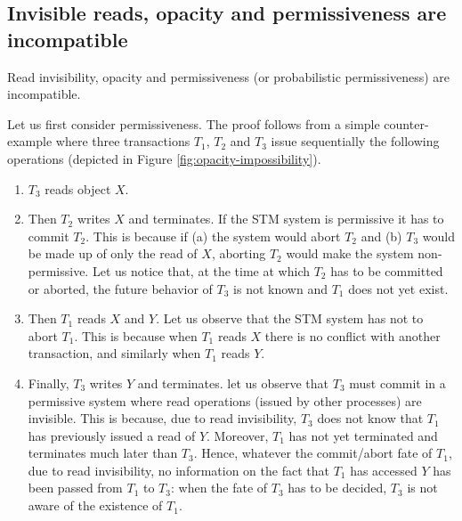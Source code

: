 \subsection{Invisible reads, opacity and permissiveness are incompatible} 
\label{sec:opacity-impos}

\begin{theorem}
\label{proof:opacity-impossibility}
Read invisibility,  opacity   and  permissiveness   (or   probabilistic
permissiveness) are incompatible. 
\end{theorem}
\vspace{-0.2cm}


\begin{proofT}
Let us first consider   permissiveness. 
The proof follows from a simple counter-example where three transactions 
$T_1$, $T_2$ and $T_3$ issue  sequentially the following operations
(depicted in  Figure \ref{fig:opacity-impossibility}).
%
\begin{enumerate}
\vspace{-0.15cm}
\item  $T_3$ reads object $X$. 
%
\vspace{-0.25cm}
\item Then $T_2$ writes $X$ and terminates.
If the STM system is permissive it has to  commit $T_2$. This is because 
if (a) the system would abort $T_2$ and (b) $T_3$ would be made up of 
only the  read of $X$,
aborting $T_2$ would make the  system non-permissive.  Let us notice  that, 
at the time at which  $T_2$ has to be committed or aborted,  the future 
behavior of $T_3$ is not known  and $T_1$  does not yet exist.  
%
\vspace{-0.25cm}
\item Then $T_1$ reads $X$ and $Y$. 
Let us observe that the STM system  has not to abort $T_1$. This is because
when $T_1$  reads $X$  there is no  conflict with another  transaction, and
similarly when $T_1$ reads $Y$. 
%
\vspace{-0.25cm}
\item Finally, $T_3$ writes $Y$ and terminates. let us observe that 
 $T_3$  must  commit in a permissive system where read operations 
(issued by other processes) are invisible. This  is because,
due to read  invisibility,  $T_3$ does not know that $T_1$ has previously
issued a read of $Y$. Moreover,  $T_1$ has not yet terminated and terminates
much later  than $T_3$. Hence, whatever the commit/abort fate of $T_1$, 
due to read invisibility, no information on  the fact that  $T_1$ has
accessed $Y$  has been passed from $T_1$ to $T_3$: when the fate of $T_3$ 
has to be decided, $T_3$ is not aware of the existence of $T_1$.


\end{enumerate}
\end{proofT}
